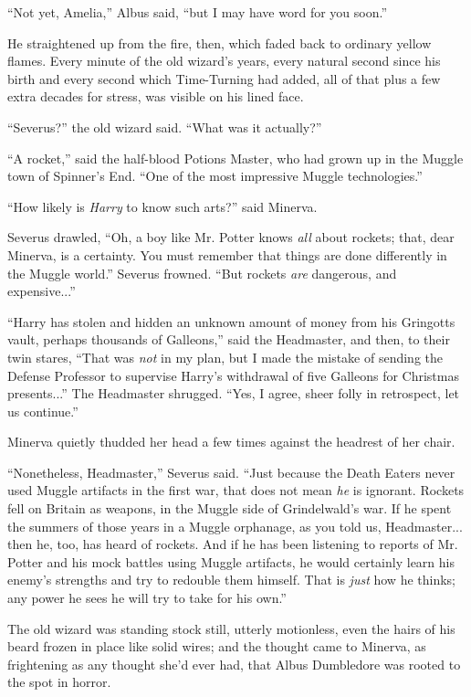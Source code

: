 ``Not yet, Amelia,'' Albus said, ``but I may have word for you soon.''

He straightened up from the fire, then, which faded back to ordinary yellow flames. Every minute of the old wizard's years, every natural second since his birth and every second which Time-Turning had added, all of that plus a few extra decades for stress, was visible on his lined face.

``Severus?'' the old wizard said. ``What was it actually?''

``A rocket,'' said the half-blood Potions Master, who had grown up in the Muggle town of Spinner's End. ``One of the most impressive Muggle technologies.''

``How likely is \emph{Harry} to know such arts?'' said Minerva.

Severus drawled, ``Oh, a boy like Mr. Potter knows \emph{all} about rockets; that, dear Minerva, is a certainty. You must remember that things are done differently in the Muggle world.'' Severus frowned. ``But rockets \emph{are} dangerous, and expensive...''

``Harry has stolen and hidden an unknown amount of money from his Gringotts vault, perhaps thousands of Galleons,'' said the Headmaster, and then, to their twin stares, ``That was \emph{not} in my plan, but I made the mistake of sending the Defense Professor to supervise Harry's withdrawal of five Galleons for Christmas presents...'' The Headmaster shrugged. ``Yes, I agree, sheer folly in retrospect, let us continue.''

Minerva quietly thudded her head a few times against the headrest of her chair.

``Nonetheless, Headmaster,'' Severus said. ``Just because the Death Eaters never used Muggle artifacts in the first war, that does not mean \emph{he} is ignorant. Rockets fell on Britain as weapons, in the Muggle side of Grindelwald's war. If he spent the summers of those years in a Muggle orphanage, as you told us, Headmaster... then he, too, has heard of rockets. And if he has been listening to reports of Mr. Potter and his mock battles using Muggle artifacts, he would certainly learn his enemy's strengths and try to redouble them himself. That is \emph{just} how he thinks; any power he sees he will try to take for his own.''

The old wizard was standing stock still, utterly motionless, even the hairs of his beard frozen in place like solid wires; and the thought came to Minerva, as frightening as any thought she'd ever had, that Albus Dumbledore was rooted to the spot in horror.

